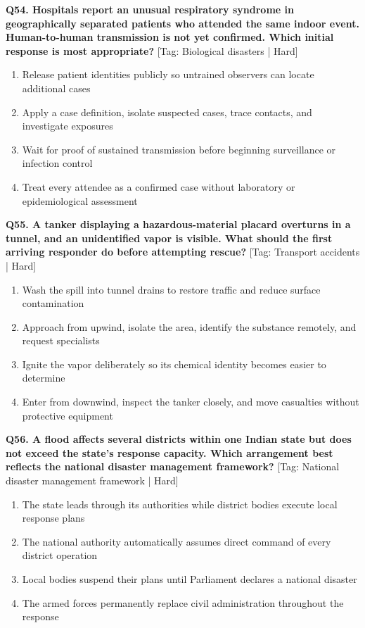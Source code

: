 \noindent\textbf{Q54. Hospitals report an unusual respiratory syndrome in geographically separated patients who attended the same indoor event. Human-to-human transmission is not yet confirmed. Which initial response is most appropriate?} \hfill [Tag: Biological disasters | Hard]
\begin{enumerate}[label=(\alph*),topsep=2pt,itemsep=1pt,partopsep=0pt,parsep=0pt]
    \item {Release patient identities publicly so untrained observers can locate additional cases}
    \item {Apply a case definition, isolate suspected cases, trace contacts, and investigate exposures}
    \item {Wait for proof of sustained transmission before beginning surveillance or infection control}
    \item {Treat every attendee as a confirmed case without laboratory or epidemiological assessment}
\end{enumerate}
\vspace{2mm}

\noindent\textbf{Q55. A tanker displaying a hazardous-material placard overturns in a tunnel, and an unidentified vapor is visible. What should the first arriving responder do before attempting rescue?} \hfill [Tag: Transport accidents | Hard]
\begin{enumerate}[label=(\alph*),topsep=2pt,itemsep=1pt,partopsep=0pt,parsep=0pt]
    \item {Wash the spill into tunnel drains to restore traffic and reduce surface contamination}
    \item {Approach from upwind, isolate the area, identify the substance remotely, and request specialists}
    \item {Ignite the vapor deliberately so its chemical identity becomes easier to determine}
    \item {Enter from downwind, inspect the tanker closely, and move casualties without protective equipment}
\end{enumerate}
\vspace{2mm}

\noindent\textbf{Q56. A flood affects several districts within one Indian state but does not exceed the state's response capacity. Which arrangement best reflects the national disaster management framework?} \hfill [Tag: National disaster management framework | Hard]
\begin{enumerate}[label=(\alph*),topsep=2pt,itemsep=1pt,partopsep=0pt,parsep=0pt]
    \item {The state leads through its authorities while district bodies execute local response plans}
    \item {The national authority automatically assumes direct command of every district operation}
    \item {Local bodies suspend their plans until Parliament declares a national disaster}
    \item {The armed forces permanently replace civil administration throughout the response}
\end{enumerate}
\vspace{2mm}

